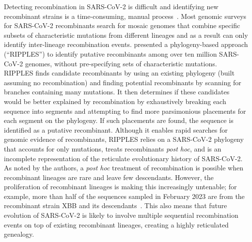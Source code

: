 \documentclass{article}
\begin{document}
Detecting recombination in SARS-CoV-2 is difficult and identifying new
recombinant strains is a time-consuming, manual
process~\citep{Smith2023-identifying}.
Most genomic surveys for SARS-CoV-2 recombinants search for mosaic genomes that
combine specific subsets of characteristic mutations from different lineages
\citep[e.g.,][]{VanInsberghe2021-eu,Jackson2021-ik,Wertheim2022-hj,Sekizuka2022-xz}
and as a result can only identify inter-lineage recombination events.
\cite{Turakhia2022-it} presented a
phylogeny-based approach (``RIPPLES'') to identify putative recombinants among
over ten million SARS-CoV-2 genomes, without pre-specifying sets of characteristic
mutations.
RIPPLES finds candidate recombinants by using an existing phylogeny
(built assuming no recombination) and finding potential recombinants
by  scanning for branches containing many mutations.
It then determines if these candidates would be better explained by
recombination by exhaustively breaking each
sequence into segments and attempting to find more parsimonious placements for
each segment on the phylogeny. If such placements are found, the sequence is
identified as a putative recombinant. Although it enables rapid searches for
genomic evidence of recombinants, RIPPLES relies on a SARS-CoV-2 phylogeny that
accounts for only mutations, treats recombinants \textit{post hoc}, and is an
incomplete representation of the reticulate evolutionary history of SARS-CoV-2.
As noted by the authors, a \textit{post hoc} treatment of recombination is
possible when recombinant lineages are rare and leave few descendants. However,
the proliferation of recombinant lineages is making this increasingly
untenable; for example, more than half of the sequences sampled in February 2023
are from the recombinant strain XBB and its descendants~\citep{Chen2022-pz}. This also means that
future evolution of SARS-CoV-2 is likely to involve multiple sequential
recombination events on top of existing recombinant lineages, creating a highly
reticulated genealogy.

\end{document}
